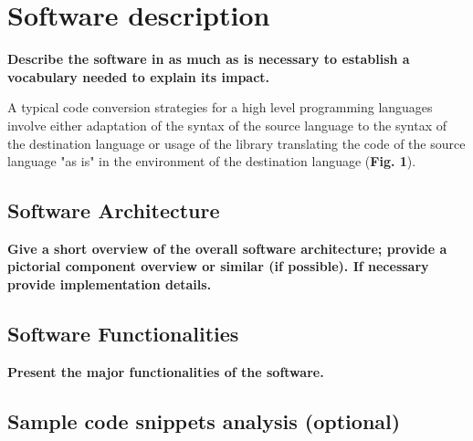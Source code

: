 \section{Software description}
\label{} 

\textbf{Describe the software in as much as is necessary to establish a vocabulary needed to explain its impact. }

A typical code conversion strategies for a high level programming languages involve either adaptation of the syntax of the source language to the syntax of the destination language or usage of the library translating the code of the source language "as is" in the environment of the destination language (\textbf{Fig. 1}).

\subsection{Software Architecture}
\label{} 

\textbf{Give a short overview of the overall software architecture; provide a pictorial component overview or similar (if possible). If necessary provide implementation details.}


\subsection{Software Functionalities}
\label{} 

\textbf{Present the major functionalities of the software.}


\subsection{Sample code snippets analysis (optional)}
\label{} 
  
  
  
  